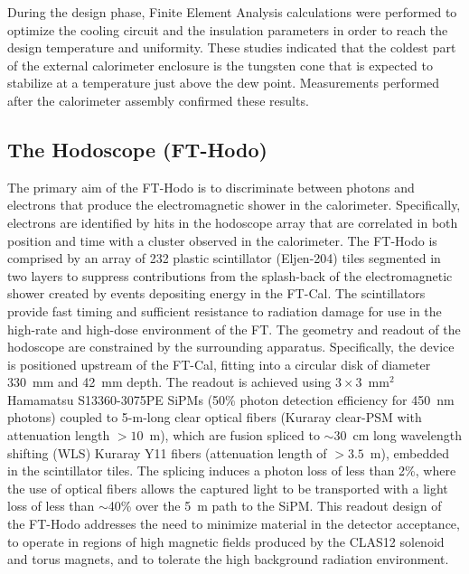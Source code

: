 During the design phase, Finite Element Analysis calculations were performed to optimize the cooling circuit and the
insulation parameters in order to reach the design temperature and uniformity. These studies indicated that the
coldest part of the external calorimeter enclosure is the tungsten cone that is expected to stabilize at a temperature
just above the dew point. Measurements performed after the calorimeter assembly confirmed these results.

\subsection{The Hodoscope (FT-Hodo)}

The primary aim of the FT-Hodo is to discriminate between photons and electrons that produce the electromagnetic
shower in the calorimeter. Specifically, electrons are identified by hits in the hodoscope array that are correlated
in both position and time with a cluster observed in the calorimeter. The FT-Hodo is comprised by an array of 232 plastic
scintillator (Eljen-204) tiles segmented in two layers to suppress contributions from the splash-back of the
electromagnetic shower created by events depositing energy in the FT-Cal. The scintillators provide fast timing and
sufficient resistance to radiation damage for use in the high-rate and high-dose environment of the FT. The geometry
and readout of the hodoscope are constrained by the surrounding apparatus. Specifically, the device is positioned
upstream of the FT-Cal, fitting into a circular disk of diameter 330~mm and 42~mm depth. The readout is achieved
using $3 \times 3$~mm$^2$ Hamamatsu S13360-3075PE SiPMs (50\% photon detection efficiency for 450~nm
photons) coupled to 5-m-long clear optical fibers (Kuraray clear-PSM with attenuation length $>10$~m), which are
fusion spliced to $\sim$30~cm long wavelength shifting (WLS) Kuraray Y11 fibers (attenuation length of $> 3.5$~m),
embedded in the scintillator tiles. The splicing induces a photon loss of less than 2\%, where the use of optical fibers
allows the captured light to be transported with a light loss of less than $\sim$40\% over the 5~m path to the SiPM.
This readout design of the FT-Hodo addresses the need to minimize material in the detector acceptance, to operate
in regions of high magnetic fields produced by the CLAS12 solenoid and torus magnets, and to tolerate the high
background radiation environment. 

